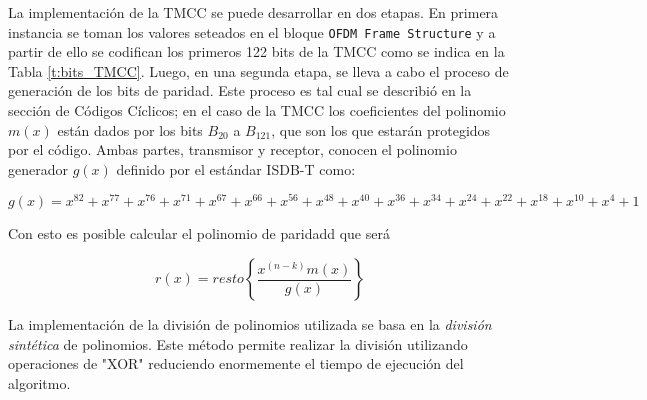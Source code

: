 La implementación de la TMCC se puede desarrollar en dos etapas. En primera instancia se toman los valores seteados en el bloque \verb|OFDM Frame Structure| y a partir de ello se codifican los primeros 122 bits de la TMCC como se indica en la Tabla \ref{t:bits_TMCC}. Luego, en una segunda etapa, se lleva a cabo el proceso de generación de los bits de paridad. Este proceso es tal cual se describió en la sección de Códigos Cíclicos; en el caso de la TMCC los coeficientes del polinomio $m(x)$ están dados por los bits $B_{20}$ a $B_{121}$, que son los que estarán protegidos por el código. Ambas partes, transmisor y receptor, conocen el polinomio generador $g(x)$ definido por el estándar ISDB-T como:

\begin{equation}
g(x) = x^{82}+x^{77}+x^{76}+x^{71}+x^{67}+x^{66}+x^{56}+x^{48}+x^{40}+x^{36}+x^{34}+x^{24}+x^{22}+x^{18}+x^{10}+x^{4}+1
\end{equation}

Con esto es posible calcular el polinomio de paridadd que será 

\begin{equation}
r(x)= resto \left\{ \dfrac{x^{(n-k)}m(x)}{g(x)} \right\}
\end{equation}

La implementación de la división de polinomios utilizada se basa en la \textit{división sintética} de polinomios. Este método permite realizar la división utilizando operaciones de "XOR" reduciendo enormemente el tiempo de ejecución del algoritmo.


